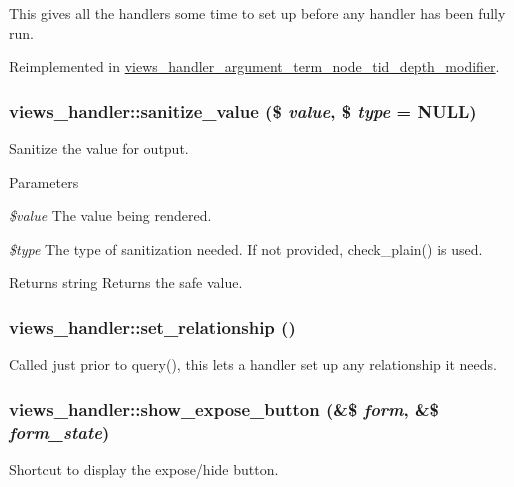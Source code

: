 This gives all the handlers some time to set up before any handler has been fully run. 

Reimplemented in \hyperlink{classviews__handler__argument__term__node__tid__depth__modifier_a278abcb2e424241efa1361d01be89eb1}{views\_\-handler\_\-argument\_\-term\_\-node\_\-tid\_\-depth\_\-modifier}.\hypertarget{classviews__handler_a0e347d00f1270832f88c46705901721e}{
\subsubsection[{sanitize\_\-value}]{\setlength{\rightskip}{0pt plus 5cm}views\_\-handler::sanitize\_\-value (\$ {\em value}, \/  \$ {\em type} = {\ttfamily NULL})}}
\label{classviews__handler_a0e347d00f1270832f88c46705901721e}
Sanitize the value for output.


\begin{DoxyParams}{Parameters}
\item[{\em \$value}]The value being rendered. \item[{\em \$type}]The type of sanitization needed. If not provided, check\_\-plain() is used.\end{DoxyParams}
\begin{DoxyReturn}{Returns}
string Returns the safe value. 
\end{DoxyReturn}
\hypertarget{classviews__handler_ac54ea4553cbc678d23b51dfad3142a54}{
\subsubsection[{set\_\-relationship}]{\setlength{\rightskip}{0pt plus 5cm}views\_\-handler::set\_\-relationship ()}}
\label{classviews__handler_ac54ea4553cbc678d23b51dfad3142a54}
Called just prior to query(), this lets a handler set up any relationship it needs. \hypertarget{classviews__handler_af519db20125fb4d1c0f7401692dcef0c}{
\subsubsection[{show\_\-expose\_\-button}]{\setlength{\rightskip}{0pt plus 5cm}views\_\-handler::show\_\-expose\_\-button (\&\$ {\em form}, \/  \&\$ {\em form\_\-state})}}
\label{classviews__handler_af519db20125fb4d1c0f7401692dcef0c}
Shortcut to display the expose/hide button. 

